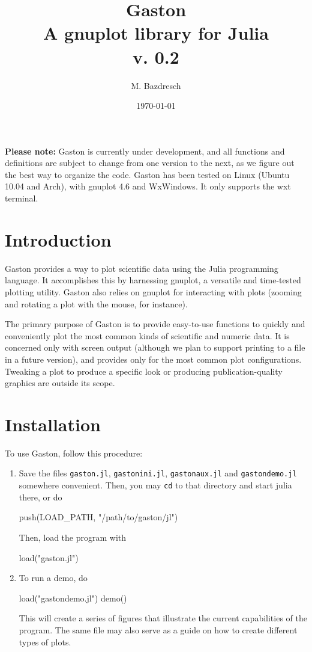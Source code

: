 \documentclass[11pt]{article}
\title{Gaston \\[0.8cm] \large A gnuplot library for Julia \\[0.8cm] v. 0.2}
\author{M. Bazdresch}
\date{\today}
\newcommand{\cmd}[1]{\texttt{#1}}
\begin{document}
\maketitle

\textbf{Please note:} Gaston is currently under development, and all functions
and definitions are subject to change from one version to the next, as we
figure out the best way to organize the code. Gaston has been tested on Linux
(Ubuntu 10.04 and Arch), with gnuplot 4.6 and WxWindows. It only supports the
wxt terminal.

\section{Introduction}

Gaston provides a way to plot scientific data using the Julia programming
language. It accomplishes this by harnessing gnuplot, a versatile and
time-tested plotting utility. Gaston also relies on gnuplot for interacting
with plots (zooming and rotating a plot with the mouse, for instance).

The primary purpose of Gaston is to provide easy-to-use functions to quickly
and conveniently plot the most common kinds of scientific and numeric data. It
is concerned only with screen output (although we plan to support printing to a
file in a future version), and provides only for the most common
plot configurations. Tweaking a plot to produce a specific look or producing
publication-quality graphics are outside its scope.

\section{Installation}

To use Gaston, follow this procedure:

\begin{enumerate}

\item Save the files \cmd{gaston.jl}, \cmd{gastonini.jl}, \cmd{gastonaux.jl}
and \cmd{gastondemo.jl} somewhere convenient. Then, you may \cmd{cd} to that
directory and start julia there, or do

\begin{juliacode}
push(LOAD_PATH, "/path/to/gaston/jl")
\end{juliacode}

Then, load the program with

\begin{juliacode}
load("gaston.jl")
\end{juliacode}

\item To run a demo, do

\begin{juliacode}
load("gastondemo.jl")
demo()
\end{juliacode}

This will create a series of figures that illustrate the current capabilities
of the program. The same file may also serve as a guide on how to create
different types of plots.
\end{enumerate}
\end{document}
